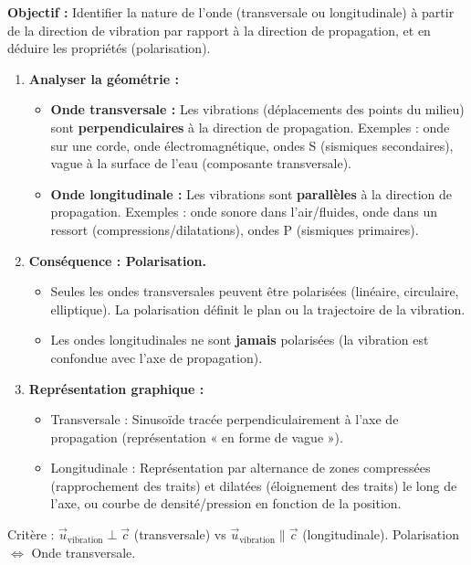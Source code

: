 \documentclass[11pt]{article}
\begin{document}
\begin{methode}
\textbf{Objectif :} Identifier la nature de l'onde (transversale ou longitudinale) à partir de la direction de vibration par rapport à la direction de propagation, et en déduire les propriétés (polarisation).
\begin{enumerate}
    \item \textbf{Analyser la géométrie :}
    \begin{itemize}
        \item \textbf{Onde transversale :} Les vibrations (déplacements des points du milieu) sont \textbf{perpendiculaires} à la direction de propagation. Exemples : onde sur une corde, onde électromagnétique, ondes S (sismiques secondaires), vague à la surface de l'eau (composante transversale).
        \item \textbf{Onde longitudinale :} Les vibrations sont \textbf{parallèles} à la direction de propagation. Exemples : onde sonore dans l'air/fluides, onde dans un ressort (compressions/dilatations), ondes P (sismiques primaires).
    \end{itemize}
    \item \textbf{Conséquence : Polarisation.}
    \begin{itemize}
        \item Seules les ondes transversales peuvent être polarisées (linéaire, circulaire, elliptique). La polarisation définit le plan ou la trajectoire de la vibration.
        \item Les ondes longitudinales ne sont \textbf{jamais} polarisées (la vibration est confondue avec l'axe de propagation).
    \end{itemize}
    \item \textbf{Représentation graphique :}
    \begin{itemize}
        \item Transversale : Sinusoïde tracée perpendiculairement à l'axe de propagation (représentation « en forme de vague »).
        \item Longitudinale : Représentation par alternance de zones compressées (rapprochement des traits) et dilatées (éloignement des traits) le long de l'axe, ou courbe de densité/pression en fonction de la position.
    \end{itemize}
\end{enumerate}
\begin{aretenir}Critère : $\vec{u}_{\text{vibration}} \perp \vec{c}$ (transversale) vs $\vec{u}_{\text{vibration}} \parallel \vec{c}$ (longitudinale). Polarisation $\iff$ Onde transversale.\end{aretenir}
\end{methode}
\end{document}
